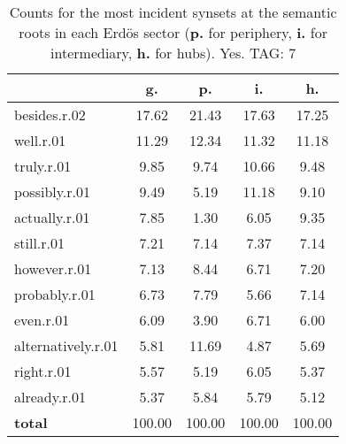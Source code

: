 \begin{table}[h!]
\begin{center}
\begin{tabular}{| l | c | c | c | c |}\hline
 & g. & p. & i. & h. \\\hline
besides.r.02 & 17.62  & 21.43  & 17.63  & 17.25 \\\hline
well.r.01 & 11.29  & 12.34  & 11.32  & 11.18 \\\hline
truly.r.01 & 9.85  & 9.74  & 10.66  & 9.48 \\\hline
possibly.r.01 & 9.49  & 5.19  & 11.18  & 9.10 \\\hline
actually.r.01 & 7.85  & 1.30  & 6.05  & 9.35 \\\hline
still.r.01 & 7.21  & 7.14  & 7.37  & 7.14 \\\hline
however.r.01 & 7.13  & 8.44  & 6.71  & 7.20 \\\hline
probably.r.01 & 6.73  & 7.79  & 5.66  & 7.14 \\\hline
even.r.01 & 6.09  & 3.90  & 6.71  & 6.00 \\\hline
alternatively.r.01 & 5.81  & 11.69  & 4.87  & 5.69 \\\hline
right.r.01 & 5.57  & 5.19  & 6.05  & 5.37 \\\hline
already.r.01 & 5.37  & 5.84  & 5.79  & 5.12 \\\hline
{{\bf total}} & 100.00  & 100.00  & 100.00  & 100.00 \\\hline
\end{tabular}
\caption{Counts for the most incident synsets at the semantic roots in each Erd\"os sector ({\bf p.} for periphery, {\bf i.} for intermediary, {\bf h.} for hubs). Yes. TAG: 7}
\end{center}
\end{table}
